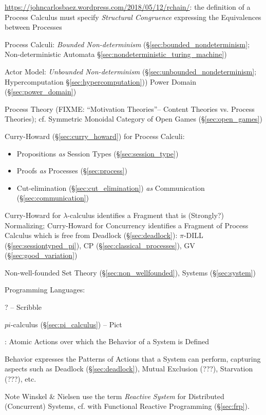 \url{https://johncarlosbaez.wordpress.com/2018/05/12/rchain/}: the definition
of a Process Calculus must specify \emph{Structural Congruence} expressing the
Equivalences between Processes


Process Calculi: \emph{Bounded Non-determinism}
(\S\ref{sec:bounded_nondeterminism}; \fist Non-deterministic Automata
\S\ref{sec:nondeterministic_turing_machine})

Actor Model: \emph{Unbounded Non-determinism}
(\S\ref{sec:unbounded_nondeterminism}; \fist Hypercomputation
\S\ref{sec:hypercomputation})) Power Domain (\S\ref{sec:power_domain})

Process Theory (FIXME: ``Motivation Theories''-- Content Theories vs. Process
Theories); cf. Symmetric Monoidal Category of Open Games
(\S\ref{sec:open_games})

Curry-Howard (\S\ref{sec:curry_howard}) for Process Calculi:
\begin{itemize}
  \item Propositions \emph{as} Session Types (\S\ref{sec:session_type})
  \item Proofs \emph{as} Processes (\S\ref{sec:process})
  \item Cut-elimination (\S\ref{sec:cut_elimination}) \emph{as}
    Communication (\S\ref{sec:communication})
\end{itemize}

Curry-Howard for $\lambda$-calculus identifies a Fragment that is
(Strongly?) Normalizing; Curry-Howard for Concurrency identifies a
Fragment of Process Calculus which is free from Deadlock
(\S\ref{sec:deadlock}): $\pi$-DILL
(\S\ref{sec:sessiontyped_pi}), CP
(\S\ref{sec:classical_processes}), GV (\S\ref{sec:good_variation})

Non-well-founded Set Theory (\S\ref{sec:non_wellfounded}), Systems
(\S\ref{sec:system})


\asterism

Programming Languages:

? -- Scribble

$pi$-calculus (\S\ref{sec:pi_calculus}) -- Pict


\asterism


\cite{winskel-nielsen93}: Atomic Actions over which the Behavior of a
System is Defined %

Behavior expresses the Patterns of Actions that a System can perform,
capturing aspects such as Deadlock (\S\ref{sec:deadlock}), Mutual
Exclusion (???), Starvation (???), etc.

\fist Note Winskel \& Nielsen \cite{winskel-nielsen93} use the term
\emph{Reactive System} for Distributed (Concurrent) Systems, cf. with
Functional Reactive Programming (\S\ref{sec:frp}).

